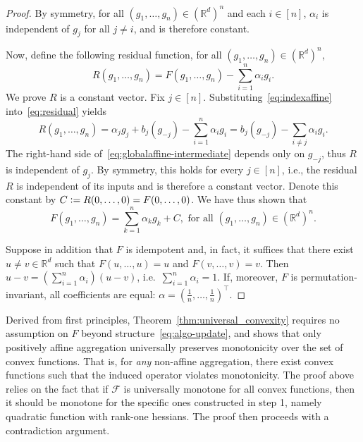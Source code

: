 \documentclass[twoside,11pt]{article}
\newcommand{\R}{\mathbb{R}}
\newcommand{\F}{\mathcal{F}}
\begin{document}
\begin{proof}
    By symmetry, for all $(g_1, \ldots, g_n) \in (\R^d)^n$ and each $i \in [n]$, $\alpha_i$ is independent of $g_j$ for all $j \neq i$, and is therefore constant. 

    Now, define the following residual function, for all $(g_1, \ldots, g_n) \in (\R^d)^n$,
    \begin{equation}\label{eq:residual}
        \textstyle R(g_1, \ldots, g_n) = F(g_1, \ldots, g_n) - \sum_{i=1}^n \alpha_i g_i. 
    \end{equation}
    We prove $R$ is a constant vector.
    Fix $j\in[n]$. Substituting~\eqref{eq:indexaffine} into~\eqref{eq:residual} yields
    \begin{equation}\label{eq:globalaffine-intermediate}
        \textstyle R(g_1, \ldots, g_n) = \alpha_j g_j + b_j(g_{-j}) - \sum_{i=1}^n \alpha_i g_i = b_j(g_{-j}) - \sum_{i \neq j} \alpha_i g_i.
    \end{equation}
    The right-hand side of~\eqref{eq:globalaffine-intermediate} depends only on $g_{-j}$, thus $R$ is independent of $g_j$.
    By symmetry, this holds for every $j \in [n]$, i.e., the residual $R$ is independent of its inputs and is therefore a constant vector.
    Denote this constant by $C \vcentcolon= R(0, \ldots, 0) = F(0, \ldots, 0)$. 
    We have thus shown that
    \begin{equation*}
        \textstyle F(g_1, \ldots, g_n) = \sum_{k=1}^n \alpha_k g_k + C, \text{ for all } (g_1, \ldots, g_n) \in (\R^d)^n.
    \end{equation*}

    Suppose in addition that $F$ is idempotent and, in fact, it suffices that there exist $u \neq v \in \R^d$ such that $F(u, \ldots, u) = u$ and $F(v, \ldots, v) = v$. Then $u-v = (\sum_{i=1}^n\alpha_i) (u-v)$, i.e.\ $\sum_{i=1}^n \alpha_i = 1$. 
    If, moreover, $F$ is permutation-invariant, all coefficients are equal: $\alpha = (\frac{1}{n}, \ldots, \frac{1}{n})^\intercal$.
\end{proof}
Derived from first principles, Theorem~\ref{thm:universal_convexity} requires no assumption on $F$ beyond structure~\eqref{eq:algo-update}, and shows that only positively affine aggregation universally preserves monotonicity over the set of convex functions.
That is, for \textit{any} non-affine aggregation, there exist convex functions such that the induced operator violates monotonicity. The proof above relies on the fact that if $\F$ is universally monotone for all convex functions, then it should be monotone for the specific ones constructed in step 1, namely quadratic function with rank-one hessians. The proof then proceeds with a contradiction argument.
\end{document}

